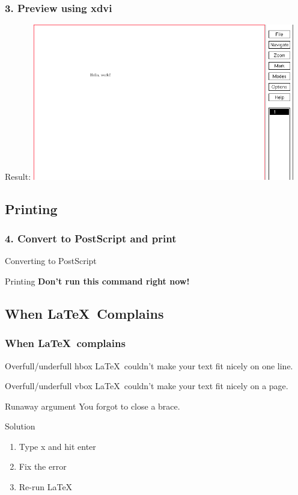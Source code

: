 \documentclass[ignorenonframetext]{beamer}
\begin{document}
\begin{frame}
  \frametitle{3. Preview using xdvi}
  \begin{block}{Result:}
    \includegraphics[width=4.5in]{images/xdvi.png}
  \end{block}
\end{frame}

\subsection{Printing}
\begin{frame}
  \frametitle{4. Convert to PostScript and print}
  \begin{block}{Converting to PostScript}
    
  \end{block}
  \begin{block}{Printing}
    \textbf{Don't run this command right now!}
    
  \end{block}
\end{frame}


\subsection{When \LaTeX\ Complains}
\begin{frame}
  \frametitle{When \LaTeX\ complains}
  \begin{block}{Overfull/underfull hbox}
    \LaTeX\ couldn't make your text fit nicely on one line.
  \end{block}
  \begin{block}{Overfull/underfull vbox}
    \LaTeX\ couldn't make your text fit nicely on a page.
  \end{block}
  \begin{block}{Runaway argument}
    You forgot to close a brace.
  \end{block}
  \begin{block}{Solution}
    \begin{enumerate}
    \item Type x and hit enter
    \item Fix the error
    \item Re-run \LaTeX
    \end{enumerate}
  \end{block}
\end{frame}
\end{document}
